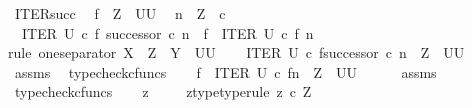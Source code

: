 \begin{isabellebody}
\endisatagproof
{\isafoldproof}%
%
\isadelimproof
\isanewline
%
\endisadelimproof
\isanewline
{}\isamarkupfalse%
\ ITER{\isacharunderscore}{\kern0pt}succ{\isacharcolon}{\kern0pt}\isanewline
\ \ {\isachardoublequoteopen}f\ {\isacharcolon}{\kern0pt}\ Z\ {\isasymrightarrow}\ {\isacharparenleft}{\kern0pt}U\isactrlbsup U\isactrlesup {\isacharparenright}{\kern0pt}{\isachardoublequoteclose}\isanewline
\ \ {\isachardoublequoteopen}n\ {\isacharcolon}{\kern0pt}\ Z\ {\isasymrightarrow}\ {\isasymnat}\isactrlsub c{\isachardoublequoteclose}\isanewline
\ \ {\isachardoublequoteopen}ITER\ U\ {\isasymcirc}\isactrlsub c\ {\isasymlangle}f{\isacharcomma}{\kern0pt}\ successor\ {\isasymcirc}\isactrlsub c\ n{\isasymrangle}\ {\isacharequal}{\kern0pt}\ f\ {\isasymbox}\ {\isacharparenleft}{\kern0pt}ITER\ U\ {\isasymcirc}\isactrlsub c\ {\isasymlangle}f{\isacharcomma}{\kern0pt}\ n\ {\isasymrangle}{\isacharparenright}{\kern0pt}{\isachardoublequoteclose}\isanewline
%
\isadelimproof
%
\endisadelimproof
%
\isatagproof
{}\isamarkupfalse%
{\isacharparenleft}{\kern0pt}rule\ one{\isacharunderscore}{\kern0pt}separator{\isacharbrackleft}{\kern0pt}\ X\ {\isacharequal}{\kern0pt}\ Z{\isacharcomma}{\kern0pt}\ \ Y\ {\isacharequal}{\kern0pt}\ {\isachardoublequoteopen}U\isactrlbsup U\isactrlesup {\isachardoublequoteclose}{\isacharbrackright}{\kern0pt}{\isacharparenright}{\kern0pt}\isanewline
\ \ \isamarkupfalse%
\ {\isachardoublequoteopen}ITER\ U\ {\isasymcirc}\isactrlsub c\ {\isasymlangle}f{\isacharcomma}{\kern0pt}successor\ {\isasymcirc}\isactrlsub c\ n{\isasymrangle}\ {\isacharcolon}{\kern0pt}\ Z\ {\isasymrightarrow}\ U\isactrlbsup U\isactrlesup {\isachardoublequoteclose}\isanewline
\ \ \ \ \isamarkupfalse%
\ assms\ \isamarkupfalse%
\ typecheck{\isacharunderscore}{\kern0pt}cfuncs\isanewline
\ \ \isamarkupfalse%
\ {\isachardoublequoteopen}f\ {\isasymbox}\ ITER\ U\ {\isasymcirc}\isactrlsub c\ {\isasymlangle}f{\isacharcomma}{\kern0pt}n{\isasymrangle}\ {\isacharcolon}{\kern0pt}\ Z\ {\isasymrightarrow}\ U\isactrlbsup U\isactrlesup {\isachardoublequoteclose}\isanewline
\ \ \ \ \isamarkupfalse%
\ assms\ \isamarkupfalse%
\ typecheck{\isacharunderscore}{\kern0pt}cfuncs\isanewline
{}\isamarkupfalse%
\isanewline
\ \ \isamarkupfalse%
\ z\ \isanewline
\ \ \isamarkupfalse%
\ z{\isacharunderscore}{\kern0pt}type{\isacharbrackleft}{\kern0pt}type{\isacharunderscore}{\kern0pt}rule{\isacharbrackright}{\kern0pt}{\isacharcolon}{\kern0pt}\ {\isachardoublequoteopen}z\ {\isasymin}\isactrlsub c\ Z{\isachardoublequoteclose}\isanewline

\end{isabellebody}
